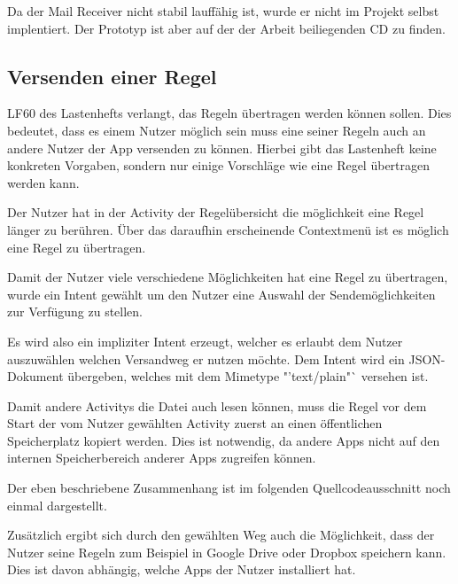 Da der Mail Receiver nicht stabil lauff\"ahig ist, wurde er nicht im Projekt selbst implentiert. Der Prototyp ist aber auf der der Arbeit beiliegenden CD zu finden.

\subsection{Versenden einer Regel}
LF60 des Lastenhefts verlangt, das Regeln \"ubertragen werden k\"onnen sollen. Dies bedeutet, dass es einem Nutzer m\"oglich sein muss eine seiner Regeln auch an andere Nutzer der App versenden zu k\"onnen. Hierbei gibt das Lastenheft keine konkreten Vorgaben, sondern nur einige Vorschl\"age wie eine Regel \"ubertragen werden kann.

Der Nutzer hat in der Activity der Regel\"ubersicht die m\"oglichkeit eine Regel l\"anger zu ber\"uhren. \"Uber das daraufhin erscheinende Contextmen\"u ist es m\"oglich eine Regel zu \"ubertragen.

Damit der Nutzer viele verschiedene M\"oglichkeiten hat eine Regel zu \"ubertragen, wurde ein Intent gew\"ahlt um den Nutzer eine Auswahl der Sendem\"oglichkeiten zur Verf\"ugung zu stellen.

Es wird also ein impliziter Intent erzeugt, welcher es erlaubt dem Nutzer auszuw\"ahlen welchen Versandweg er nutzen m\"ochte. Dem Intent wird ein JSON-Dokument \"ubergeben, welches mit dem Mimetype "'text/plain"` versehen ist.

Damit andere Activitys die Datei auch lesen k\"onnen, muss die Regel vor dem Start der vom Nutzer gew\"ahlten Activity zuerst an einen \"offentlichen Speicherplatz kopiert werden.
Dies ist notwendig, da andere Apps nicht auf den internen Speicherbereich anderer Apps zugreifen k\"onnen.

Der eben beschriebene Zusammenhang ist im folgenden Quellcodeausschnitt noch einmal dargestellt. \cite{AttachFileToIntent}



Zus\"atzlich ergibt sich durch den gew\"ahlten Weg auch die M\"oglichkeit, dass der Nutzer seine Regeln zum Beispiel in Google Drive oder Dropbox speichern kann. Dies ist davon abh\"angig, welche Apps der Nutzer installiert hat.